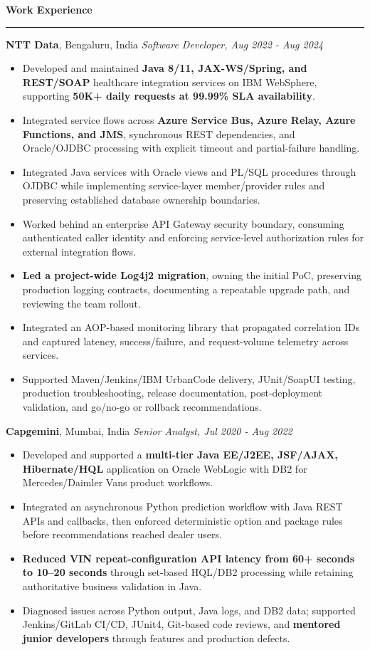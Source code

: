\documentclass[11pt,letterpaper]{article}
\newcommand{\ressection}[1]{\Needspace{6\baselineskip}\vspace{8pt}\par\textbf{#1}\par\vspace{2pt}\hrule\vspace{5pt}}
\begin{document}
\ressection{Work Experience}
\textbf{NTT Data}, Bengaluru, India \hfill \textit{Software Developer, Aug 2022 - Aug 2024}
\begin{itemize}
  \item Developed and maintained \textbf{Java 8/11, JAX-WS/Spring, and REST/SOAP} healthcare integration services on IBM WebSphere, supporting \textbf{50K+ daily requests at 99.99\% SLA availability}.
  \item Integrated service flows across \textbf{Azure Service Bus, Azure Relay, Azure Functions, and JMS}, synchronous REST dependencies, and Oracle/OJDBC processing with explicit timeout and partial-failure handling.
  \item Integrated Java services with Oracle views and PL/SQL procedures through OJDBC while implementing service-layer member/provider rules and preserving established database ownership boundaries.
  \item Worked behind an enterprise API Gateway security boundary, consuming authenticated caller identity and enforcing service-level authorization rules for external integration flows.
  \item \textbf{Led a project-wide Log4j2 migration}, owning the initial PoC, preserving production logging contracts, documenting a repeatable upgrade path, and reviewing the team rollout.
  \item Integrated an AOP-based monitoring library that propagated correlation IDs and captured latency, success/failure, and request-volume telemetry across services.
  \item Supported Maven/Jenkins/IBM UrbanCode delivery, JUnit/SoapUI testing, production troubleshooting, release documentation, post-deployment validation, and go/no-go or rollback recommendations.
\end{itemize}
\textbf{Capgemini}, Mumbai, India \hfill \textit{Senior Analyst, Jul 2020 - Aug 2022}
\begin{itemize}
  \item Developed and supported a \textbf{multi-tier Java EE/J2EE, JSF/AJAX, Hibernate/HQL} application on Oracle WebLogic with DB2 for Mercedes/Daimler Vans product workflows.
  \item Integrated an asynchronous Python prediction workflow with Java REST APIs and callbacks, then enforced deterministic option and package rules before recommendations reached dealer users.
  \item \textbf{Reduced VIN repeat-configuration API latency from 60+ seconds to 10--20 seconds} through set-based HQL/DB2 processing while retaining authoritative business validation in Java.
  \item Diagnosed issues across Python output, Java logs, and DB2 data; supported Jenkins/GitLab CI/CD, JUnit4, Git-based code reviews, and \textbf{mentored junior developers} through features and production defects.
\end{itemize}
\end{document}
